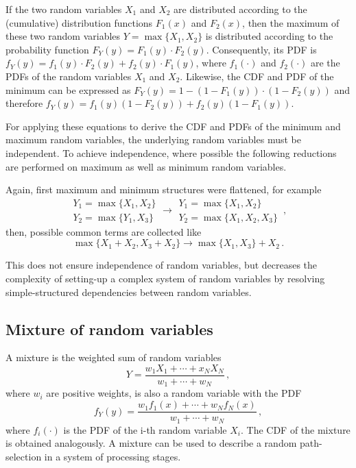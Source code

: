 \documentclass[a4paper, 10pt]{paper}
\begin{document}
If the two random variables $X_1$ and $X_2$ are distributed according to the (cumulative) distribution
functions $F_1(x)$ and $F_2(x)$, then the maximum of these two random variables $Y=\max\{X_1,X_2\}$
is distributed according to the probability function $F_Y(y)=F_1(y)\cdot F_2(y)$. Consequently, its PDF
is $f_Y(y)=f_1(y)\cdot F_2(y) + f_2(y)\cdot F_1(y)$, where $f_1(\cdot)$ and $f_2(\cdot)$ are the PDFs
of the random variables $X_1$ and $X_2$. Likewise, the CDF and PDF of the minimum can be expressed as
$F_Y(y)=1-(1-F_1(y))\cdot(1-F_2(y))$ and therefore $f_Y(y) = f_1(y)(1-F_2(y)) + f_2(y)(1-F_1(y))$.

For applying these equations to derive the CDF and PDFs of the minimum and maximum random variables, the 
underlying random variables must be independent. To achieve independence, where possible the following 
reductions are performed on maximum as well as minimum random variables.

Again, first maximum and minimum structures were flattened, for example
\begin{equation}
 \begin{array}{l}
  Y_1 = \max\{X_1,X_2\}\\
  Y_2 = \max\{Y_1,X_3\}
 \end{array} \longrightarrow
 \begin{array}{l}
  Y_1 = \max\{X_1,X_2\}\\
  Y_2 = \max\{X_1,X_2,X_3\}
 \end{array}\,, \nonumber
\end{equation}
then, possible common terms are collected like
\begin{equation}
 \max\{X_1 + X_2, X_3 + X_2\} \longrightarrow \max\{X_1,X_3\}+X_2\,. \nonumber
\end{equation}

This does not ensure independence of random variables, but decreases the complexity of
setting-up a complex system of random variables by resolving simple-structured 
dependencies between random variables.

\subsection{Mixture of random variables}
A mixture is the weighted sum of random variables
\begin{equation}
 Y = \frac{w_1X_1+\cdots+x_NX_N}{w_1+\cdots+w_N}\,, \nonumber
\end{equation}
where $w_i$ are positive weights, is also a random variable with the PDF
\begin{equation}
 f_Y(y) = \frac{w_1f_1(x)+\cdots+w_Nf_N(x)}{w_1+\cdots+w_N}\,,\nonumber
\end{equation}
where $f_i(\cdot)$ is the PDF of the i-th random variable $X_i$. The CDF of the
mixture is obtained analogously. A mixture can be used to describe a random 
path-selection in a system of processing stages. 
\end{document}
